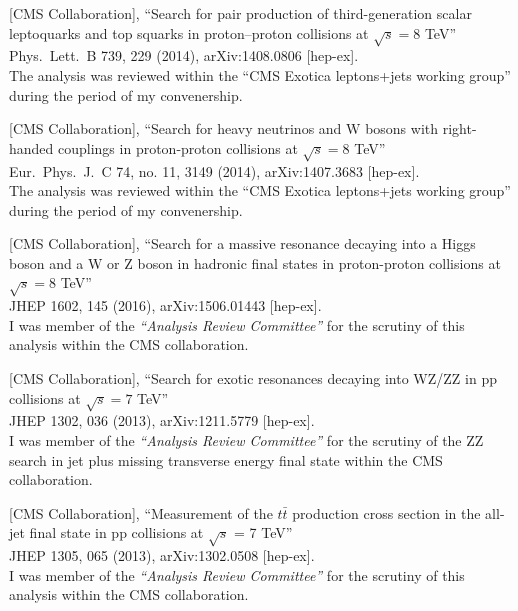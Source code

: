 \documentclass[10pt, a4paper]{article}
\begin{document}
\begin{thebibliography}{599}
  [CMS Collaboration],
 ``Search for pair production of third-generation scalar leptoquarks
  and top squarks in proton–proton collisions at $\sqrt{s}=8$ TeV''\\
  Phys.\ Lett.\ B 739, 229 (2014), arXiv:1408.0806 [hep-ex].\\
The analysis was reviewed within the ``CMS Exotica leptons+jets working group'' during
the period of my convenership.

  [CMS Collaboration],
 ``Search for heavy neutrinos and $\mathrm {W}$ bosons with
  right-handed couplings in proton-proton collisions at $\sqrt{s}=8$ TeV''\\
  Eur.\ Phys.\ J.\ C 74, no. 11, 3149 (2014), arXiv:1407.3683
  [hep-ex].\\
The analysis was reviewed within the ``CMS Exotica leptons+jets working group'' during
the period of my convenership.

[CMS Collaboration],
``Search for a massive resonance decaying into a Higgs boson and a W or Z boson in hadronic final states in proton-proton collisions at $ \sqrt{s}=8 $ TeV''\\
  JHEP 1602, 145 (2016), arXiv:1506.01443 [hep-ex].
  \\ I was member of the {\it``Analysis Review Committee''} for the scrutiny of this analysis within the CMS collaboration. 

[CMS Collaboration],
 ``Search for exotic resonances decaying into WZ/ZZ in pp collisions at $\sqrt{s}=7$ TeV''\\
 JHEP 1302, 036 (2013), arXiv:1211.5779 [hep-ex].
  \\ I was member of the {\it``Analysis Review Committee''} for the scrutiny of the ZZ search in jet plus missing transverse energy final state within the CMS collaboration. 

[CMS Collaboration],
  ``Measurement of the $t\bar{t}$ production cross section in the all-jet final state in pp collisions at $\sqrt{s}$ = 7 TeV''\\
  JHEP 1305, 065 (2013), arXiv:1302.0508 [hep-ex].
  \\ I was member of the {\it``Analysis Review Committee''} for the scrutiny of this analysis within the CMS collaboration. 


\end{thebibliography}
\end{document}
